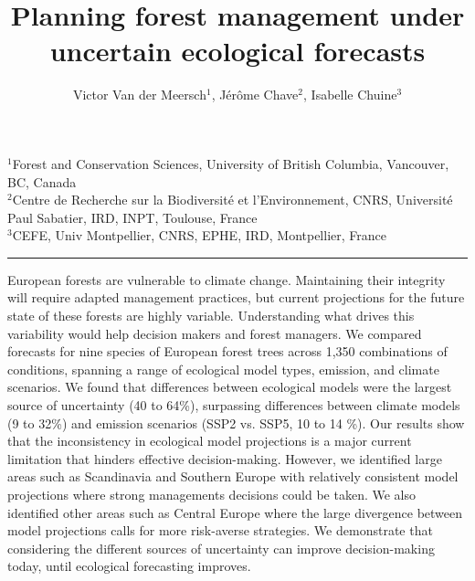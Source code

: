 \documentclass[11pt,letter]{article}
\begin{document}
\title{Planning forest management under uncertain ecological forecasts
}

\author{Victor Van der Meersch$^{1}$, Jérôme Chave$^{2}$, Isabelle Chuine$^{3}$} %
\date{}
\maketitle 
\vspace{-0.8cm}
{\footnotesize
\noindent $^{1}$Forest and Conservation Sciences, University of British Columbia, Vancouver, BC, Canada\\
$^{2}$Centre de Recherche sur la Biodiversité et l'Environnement, CNRS, Université Paul Sabatier, IRD, INPT, Toulouse, France  \\
$^{3}$CEFE, Univ Montpellier, CNRS, EPHE, IRD, Montpellier, France}

\noindent\rule{\textwidth}{0.3pt}
European forests are vulnerable to climate change. Maintaining their integrity will require adapted management practices, but current projections for the future state of these forests are highly variable. Understanding what drives this variability would help decision makers and forest managers. We compared forecasts for nine species of European forest trees across 1,350 combinations of conditions, spanning a range of ecological model types, emission, and climate scenarios. We found that differences between ecological models were the largest source of uncertainty (40 to 64\%), surpassing differences between climate models (9 to 32\%) and emission scenarios (SSP2 vs. SSP5, 10 to 14 \%). 
Our results show that the inconsistency in ecological model projections is a major current limitation that hinders effective decision-making. However, we identified large areas such as Scandinavia and Southern Europe with relatively consistent model projections where strong managements decisions could be taken. We also identified other areas such as Central Europe where the large divergence between model projections calls for more risk-averse strategies. We demonstrate that considering the different sources of uncertainty can improve decision-making today, until ecological forecasting improves. 
\end{document}
